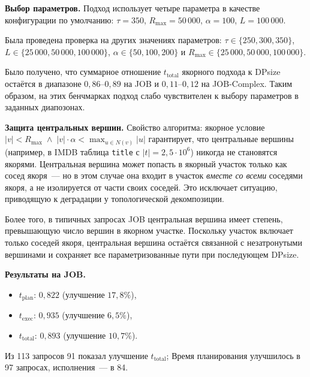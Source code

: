 \newpage

\textbf{Выбор параметров.}
Подход использует четыре параметра в качестве конфигурации по умолчанию: $\tau = 350$, $R_{\max} = 50\,000$,
$\alpha = 100$, $L = 100\,000$.
\par

Была проведена проверка на других значениях параметров: $\tau \in \{250, 300, 350\}$,
$L \in \{25\,000, 50\,000, 100\,000\}$,
$\alpha \in \{50, 100, 200\}$ и $R_{\max} \in \{25\,000, 50\,000, 100\,000\}$.
 
Было получено, что суммарное отношение $t_{\mathrm{total}}$ якорного подхода
к DPsize остаётся в диапазоне
$0{,}86$--$0{,}89$ на JOB и $0{,}11$--$0{,}12$ на JOB-Complex.
Таким образом, на этих бенчмарках подход слабо чувствителен к выбору параметров в заданных диапозонах.
\par

\textbf{Защита центральных вершин.}
Свойство алгоритма: якорное условие
$|v| < R_{\max} \;\wedge\; |v| \cdot \alpha < \max_{u \in N(v)} |u|$
гарантирует, что центральные вершины (например, в IMDB таблица \texttt{title}
с $|t| = 2{,}5 \cdot 10^6$) никогда не становятся якорями.
Центральная вершина может попасть в якорный участок только как сосед якоря~---
но в этом случае она входит в участок \emph{вместе со всеми} соседями якоря,
а не изолируется от части своих соседей.
Это исключает ситуацию, приводящую к деградации у топологической декомпозиции.
\par

Более того, в типичных запросах JOB центральная вершина имеет степень,
превышающую число вершин в якорном участке.
Поскольку участок включает только соседей якоря,
центральная вершина остаётся связанной с незатронутыми вершинами
и сохраняет все параметризованные пути при последующем DPsize.
\par


\textbf{Результаты на JOB.}
\begin{itemize}
    \item $t_{\mathrm{plan}}$: $0{,}822$ (улучшение $17{,}8\%$),
    \item $t_{\mathrm{exec}}$: $0{,}935$ (улучшение $6{,}5\%$),
    \item $t_{\mathrm{total}}$: $0{,}893$ (улучшение $10{,}7\%$).
\end{itemize}

Из 113 запросов 91 показал улучшение $t_{\mathrm{total}}$; 
Время планирования улучшилось в 97 запросах, исполнения~--- в 84.
\par

